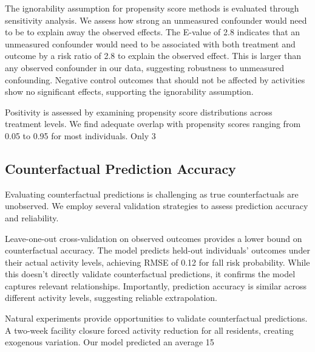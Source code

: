 \documentclass[journal]{IEEEtran}
\begin{document}
The ignorability assumption for propensity score methods is evaluated through sensitivity analysis. We assess how strong an unmeasured confounder would need to be to explain away the observed effects. The E-value of 2.8 indicates that an unmeasured confounder would need to be associated with both treatment and outcome by a risk ratio of 2.8 to explain the observed effect. This is larger than any observed confounder in our data, suggesting robustness to unmeasured confounding. Negative control outcomes that should not be affected by activities show no significant effects, supporting the ignorability assumption.

Positivity is assessed by examining propensity score distributions across treatment levels. We find adequate overlap with propensity scores ranging from 0.05 to 0.95 for most individuals. Only 3%

\subsection{Counterfactual Prediction Accuracy}

Evaluating counterfactual predictions is challenging as true counterfactuals are unobserved. We employ several validation strategies to assess prediction accuracy and reliability.

Leave-one-out cross-validation on observed outcomes provides a lower bound on counterfactual accuracy. The model predicts held-out individuals' outcomes under their actual activity levels, achieving RMSE of 0.12 for fall risk probability. While this doesn't directly validate counterfactual predictions, it confirms the model captures relevant relationships. Importantly, prediction accuracy is similar across different activity levels, suggesting reliable extrapolation.

Natural experiments provide opportunities to validate counterfactual predictions. A two-week facility closure forced activity reduction for all residents, creating exogenous variation. Our model predicted an average 15%
\end{document}

